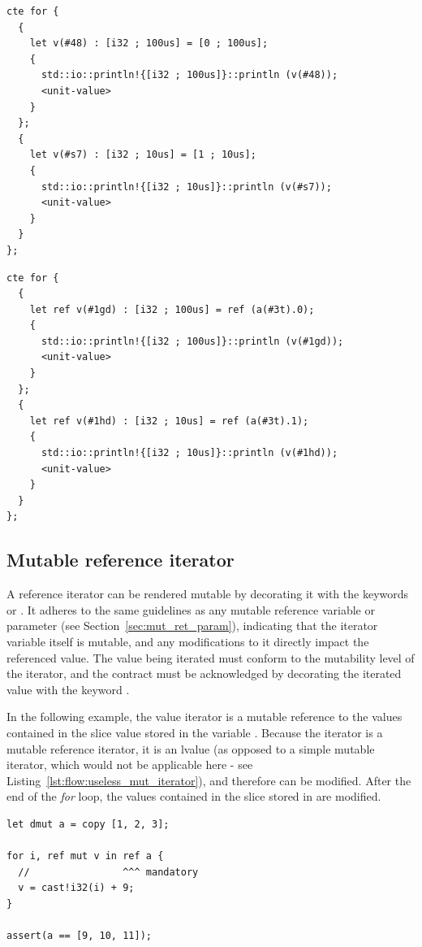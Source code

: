 \begin{lstlisting}[style=myilVerb, caption=By copy iteration on a tuple, label=lst:flow:copy_value_iter_tu]
cte for {
  {
    let v(#48) : [i32 ; 100us] = [0 ; 100us];
    {
      std::io::println!{[i32 ; 100us]}::println (v(#48));
      <unit-value>
    }
  };
  {
    let v(#s7) : [i32 ; 10us] = [1 ; 10us];
    {
      std::io::println!{[i32 ; 10us]}::println (v(#s7));
      <unit-value>
    }
  }
};
\end{lstlisting}

\begin{lstlisting}[style=myilVerb, caption=By reference iteration on a tuple, label=lst:flow:ref_value_iter_tu]
cte for {
  {
    let ref v(#1gd) : [i32 ; 100us] = ref (a(#3t).0);
    {
      std::io::println!{[i32 ; 100us]}::println (v(#1gd));
      <unit-value>
    }
  };
  {
    let ref v(#1hd) : [i32 ; 10us] = ref (a(#3t).1);
    {
      std::io::println!{[i32 ; 10us]}::println (v(#1hd));
      <unit-value>
    }
  }
};
\end{lstlisting}

\subsection{Mutable reference iterator}

A reference iterator can be rendered mutable by decorating it with the keywords
 or . It adheres to the same guidelines as any mutable
reference variable or parameter (see Section~\ref{sec:mut_ret_param}),
indicating that the iterator variable itself is mutable, and any modifications
to it directly impact the referenced value. The value being iterated must
conform to the mutability level of the iterator, and the contract must be
acknowledged by decorating the iterated value with the keyword .

In the following example, the value iterator is a mutable reference to the
values contained in the slice value stored in the variable . Because
the iterator is a mutable reference iterator, it is an lvalue (as opposed to a
simple mutable iterator, which would not be applicable here - see
Listing~\ref{lst:flow:useless_mut_iterator}), and therefore can be modified. After
the end of the \textit{for} loop, the values contained in the slice stored in
 are modified.

\begin{lstlisting}[style=coloredverbatim, escapechar=@]
let dmut a = copy [1, 2, 3];

for i, ref mut v in ref a {
  //                ^^^ mandatory
  v = cast!i32(i) + 9;
}

assert(a == [9, 10, 11]);
\end{lstlisting}

